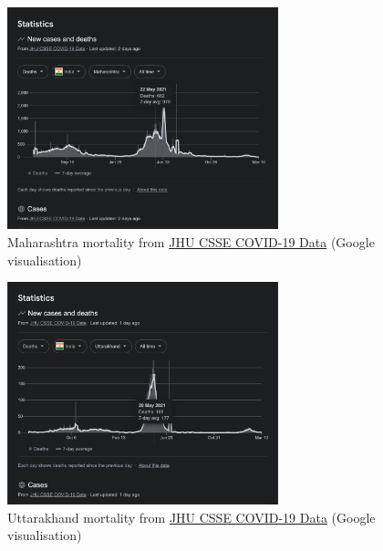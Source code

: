 \documentclass[11pt,a4paper,notitlepage]{report}
\begin{document}
\begin{figure}[h]
    \centering
    \includegraphics[width=0.7\textwidth]{india-maharashtra-mortality}
    \caption{Maharashtra mortality from \href{https://github.com/CSSEGISandData/COVID-19}{JHU CSSE COVID-19 Data} (Google visualisation)}
    \label{fig:india-maharashtra-mortality}
\end{figure}

\begin{figure}[h]
    \centering
    \includegraphics[width=0.7\textwidth]{india-uttarakhand-mortality}
    \caption{Uttarakhand mortality from \href{https://github.com/CSSEGISandData/COVID-19}{JHU CSSE COVID-19 Data} (Google visualisation)}
    \label{fig:india-uttarakhand-mortality}
\end{figure}
\end{document}
